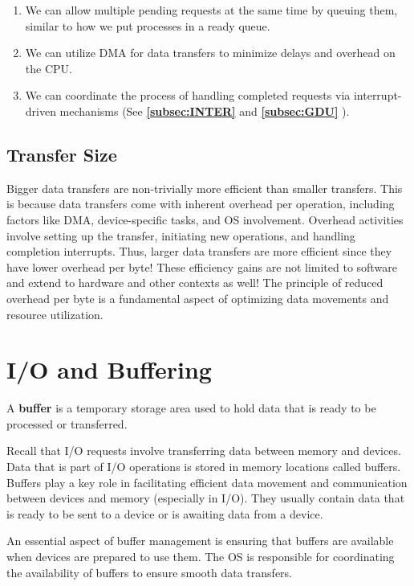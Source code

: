 \documentclass{report}
\newcommand{\definitionBegin}[1]{\begin{tcolorbox}[title={Definition: #1}]}
\newcommand{\definitionEnd}{\end{tcolorbox}}
\newcommand{\refto}[2]{\textbf{\ref{#1:#2} \nameref{#1:#2}}}
\begin{document}
\begin{enumerate}[label=\textit{(\roman*)}]
\item We can allow multiple pending requests at the same time by queuing them, similar to how we put
processes in a ready queue.
\item We can utilize DMA for data transfers to minimize delays and overhead on the CPU.
\item We can coordinate the process of handling completed requests via interrupt-driven mechanisms
  (See \refto{subsec}{INTER} and \refto{subsec}{GDU}).
\end{enumerate}


\subsection{Transfer Size}
Bigger data transfers are non-trivially more efficient than smaller transfers. This is because data
transfers come with inherent overhead per operation, including factors like DMA, device-specific
tasks, and OS involvement. Overhead activities involve setting up the transfer, initiating new
operations, and handling completion interrupts. Thus, larger data transfers are more efficient since
they have lower overhead per byte! These efficiency gains are not limited to software and extend to
hardware and other contexts as well! The principle of reduced overhead per byte is a fundamental
aspect of optimizing data movements and resource utilization.


\section{I/O and Buffering}
\definitionBegin{Buffer}
A \textbf{buffer} is a temporary storage area used to hold data that is ready to be processed or
transferred.
\definitionEnd

Recall that I/O requests involve transferring data between memory and devices. Data that is part
of I/O operations is stored in memory locations called buffers. Buffers play a key role in
facilitating efficient data movement and communication between devices and memory (especially in
I/O). They usually contain data that is ready to be sent to a device or is awaiting data from a
device.

An essential aspect of buffer management is ensuring that buffers are available when devices are
prepared to use them. The OS is responsible for coordinating the availability of buffers to ensure
smooth data transfers.
\end{document}
